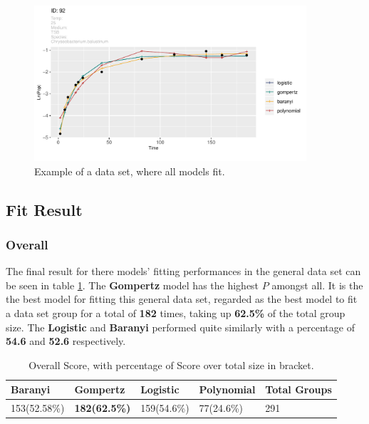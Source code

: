 \documentclass[11pt]{article}
\begin{document}
\FloatBarrier
\begin{figure}[!htbp]
    \centering
    \includegraphics[width=0.9\textwidth]{../Results/allPlots/92.pdf}
    \caption{Example of a data set, where all models fit.}
    \label{fig:gooddata}
\end{figure}
\FloatBarrier

\subsection{Fit Result}
\subsubsection{Overall}
The final result for there models' fitting performances in the general data set can be seen in table \ref{tab: overallS}. The \textbf{Gompertz} model has the highest $P$ amongst all. It is the the best model for fitting this general data set, regarded as the best model to fit a data set group for a total of \textbf{182} times, taking up \textbf{62.5\%} of the total group size. The \textbf{Logistic} and \textbf{Baranyi} performed quite similarly with a percentage of \textbf{54.6} and \textbf{52.6} respectively.\\
\FloatBarrier
\begin{table}[!htbp]
\begin{tabularx}{\linewidth}{X X X X X}
\toprule Baranyi& \textbf{Gompertz} & Logistic & Polynomial & Total Groups\\
\midrule
 153(52.58\%) & \textbf{182(62.5\%)} & 159(54.6\%) & 77(24.6\%) & 291 \\
\bottomrule
\end{tabularx}
\caption{Overall Score, with percentage of Score over total size in bracket.}
\label{tab: overallS}
\end{table}          
\FloatBarrier
\end{document}
